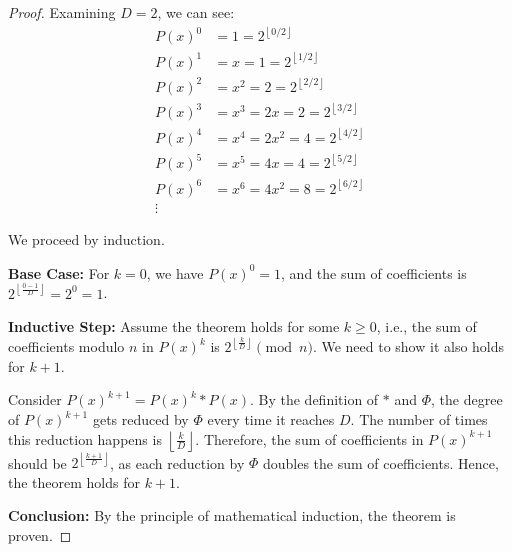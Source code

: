 \documentclass{article}
\theoremstyle{plain}
\theoremstyle{definition}
\begin{document}
\begin{proof}
Examining $D = 2$, we can see:
\begin{align*}
P(x)^0 &= 1 = 2^{\left\lfloor 0/2 \right\rfloor} \\
P(x)^1 &= x = 1 = 2^{\left\lfloor 1/2 \right\rfloor} \\
P(x)^2 &= x^2 = 2 = 2^{\left\lfloor 2/2 \right\rfloor}\\
P(x)^3 &= x^3 = 2x = 2 = 2^{\left\lfloor 3/2 \right\rfloor}\\
P(x)^4 &= x^4 = 2x^2 = 4 = 2^{\left\lfloor 4/2 \right\rfloor}\\
P(x)^5 &= x^5 = 4x = 4 = 2^{\left\lfloor 5/2 \right\rfloor}\\
P(x)^6 &= x^6 = 4x^2 = 8 = 2^{\left\lfloor 6/2 \right\rfloor}\\
\vdots
\end{align*}

We proceed by induction.

\textbf{Base Case:}
For \( k = 0 \), we have \( P(x)^0 = 1 \), and the sum of coefficients is \( 2^{\left\lfloor \frac{0-1}{D} \right\rfloor} = 2^{0} = 1 \).

\textbf{Inductive Step:}
Assume the theorem holds for some \( k \geq 0 \), i.e., the sum of coefficients modulo \( n \) in \( P(x)^k \) is \( 2^{\left\lfloor \frac{k}{D} \right\rfloor} \pmod{n} \). We need to show it also holds for \( k+1 \).

Consider \( P(x)^{k+1} = P(x)^k \ast P(x) \). By the definition of \( \ast \) and \( \Phi \), the degree of \( P(x)^{k+1} \) gets reduced by \( \Phi \) every time it reaches \( D \). The number of times this reduction happens is \( \left\lfloor \frac{k}{D} \right\rfloor \). Therefore, the sum of coefficients in \( P(x)^{k+1} \) should be \( 2^{\left\lfloor \frac{k+1}{D} \right\rfloor} \), as each reduction by \( \Phi \) doubles the sum of coefficients. Hence, the theorem holds for \( k+1 \).

\textbf{Conclusion:}
By the principle of mathematical induction, the theorem is proven.
\end{proof}
\end{document}
